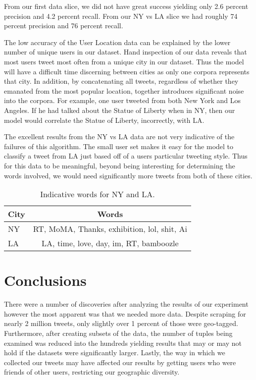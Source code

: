 \documentclass[12pt]{article}
\begin{document}
From our first data slice, we did not have great success yielding only 2.6 percent precision and 4.2 percent recall.  From our NY vs LA slice we had roughly 74 percent precision and 76 percent recall. 

The low accuracy of the User Location data can be explained by the lower number of unique users in our dataset. Hand inspection of our data reveals that most users tweet most often from a unique city in our dataset. Thus the model will have a difficult time discerning between cities as only one corpora represents that city. In addition, by concatenating all tweets, regardless of whether they emanated from the most popular location, together introduces significant noise into the corpora. For example, one user tweeted from both New York and Los Angeles. If he had talked about the Statue of Liberty when in NY, then our model would correlate the Statue of Liberty, incorrectly, with LA.

The excellent results from the NY vs LA data are not very indicative of the failures of this algorithm. The small user set makes it easy for the model to classify a tweet from LA just based off of a users particular tweeting style. Thus for this data to be meaningful, beyond being interesting for determining the words involved, we would need significantly more tweets from both of these cities. 


\begin{table}
	\begin{center}
		\begin{tabular}{| l || c |}
			\hline
			City & Words \\ \hline
			NY & RT, MoMA, Thanks, exhibition, lol, shit, Ai \\ \hline
			LA & LA, time, love, day, im, RT, bamboozle \\ 
			\hline
		\end{tabular}
	\end{center}
	\caption{Indicative words for NY and LA.}
	\label{table:poploc}
\end{table}

\section*{Conclusions}
There were a number of discoveries after analyzing the results of our experiment however the most apparent was that we needed more data.  Despite scraping for nearly 2 million tweets, only slightly over 1 percent of those were geo-tagged.  Furthermore, after creating subsets of the data, the number of tuples being examined was reduced into the hundreds yielding results that may or may not hold if the datasets were significantly larger.  Lastly, the way in which we collected our tweets may have affected our results by getting users who were friends of other users, restricting our geographic diversity.  
\end{document}
